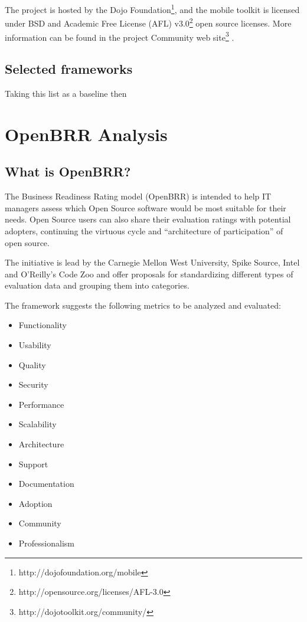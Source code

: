 \documentclass[a4paper,12pt]{book}
\begin{document}
The project is hosted by the Dojo Foundation\footnote{http://dojofoundation.org/mobile}, and the mobile toolkit is licensed under BSD and Academic Free License (AFL) v3.0\footnote{http://opensource.org/licenses/AFL-3.0} open source licenses. More information can be found in the project Community web site\footnote{http://dojotoolkit.org/community/} .

\section{Selected frameworks}
\label{sec:selected}
Taking this list as a baseline then






\chapter{OpenBRR Analysis}
\label{chap:openbrr}

\section{What is OpenBRR?}
\label{sec:openbrr2}

The Business Readiness Rating model (OpenBRR)\cite{OpenBRRWhitepaper} is
intended to help IT managers assess which Open Source software would be most suitable for their needs. Open Source users can also share their evaluation ratings with potential adopters, continuing the virtuous cycle and “architecture of participation” of open
source.

The initiative\cite{The OpenBRR Corporate Community}  is lead by the Carnegie Mellon West University, Spike Source, Intel and O’Reilly’s Code Zoo and offer proposals for standardizing different types of evaluation data and grouping them into categories.

The framework suggests the following metrics to be analyzed and evaluated:
\begin{itemize}
\item Functionality
\item Usability
\item Quality
\item Security
\item Performance
\item Scalability
\item Architecture
\item Support
\item Documentation
\item Adoption
\item Community
\item Professionalism
\end{itemize}
\end{document}
